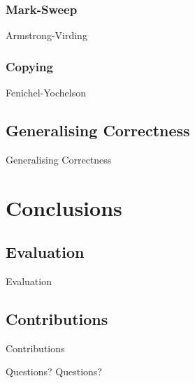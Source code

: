 \documentclass{beamer}
\begin{document}
\subsubsection{Mark-Sweep}

\begin{frame}{Armstrong-Virding}
\end{frame}

\subsubsection{Copying}

\begin{frame}{Fenichel-Yochelson}
\end{frame}

\subsection{Generalising Correctness}

\begin{frame}{Generalising Correctness}
\end{frame}


\section{Conclusions}
\subsection{Evaluation}

\begin{frame}{Evaluation}
\end{frame}

\subsection{Contributions}

\begin{frame}{Contributions}
\end{frame}


\begin{frame}{Questions?}
  \centering \huge Questions?
\end{frame}
\end{document}
